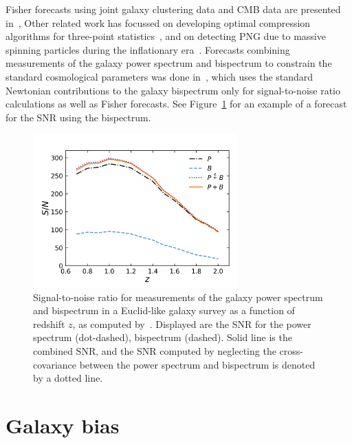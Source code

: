 Fisher forecasts using joint galaxy clustering data and CMB data are presented in~\cite{Sefusatti:2006pa}, Other related work has focussed on developing optimal compression algorithms for three-point statistics~\cite{Byun:2017fkz,Gualdi:2018pyw}, and on detecting PNG due to massive spinning particles during the inflationary era~\cite{MoradinezhadDizgah:2018ssw}. Forecasts combining measurements of the galaxy power spectrum and bispectrum to constrain the standard cosmological parameters was done in~\cite{Yankelevich:2018uaz}, which uses the standard Newtonian contributions to the galaxy bispectrum only for signal-to-noise ratio calculations as well as Fisher forecasts. See Figure~\ref{fig:snr_yp} for an example of a forecast for the SNR using the bispectrum.

\begin{figure}[!ht]
	\centering
	\includegraphics[width=0.7\textwidth]{fig/ypsnr.png}
	\caption{Signal-to-noise ratio for measurements of the galaxy power spectrum and bispectrum in a Euclid-like galaxy survey as a function of redshift $z$, as computed by~\cite{Yankelevich:2018uaz}. Displayed are the SNR for the power spectrum (dot-dashed), bispectrum (dashed). Solid line is the combined SNR, and the SNR computed by neglecting the cross-covariance between the power spectrum and bispectrum is denoted by a dotted line.}
	\label{fig:snr_yp}
\end{figure}

\section{Galaxy bias}
\label{section:galaxybias}


